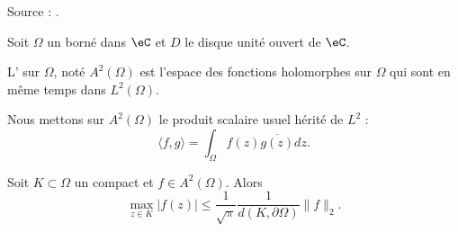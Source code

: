 Source : \cite{ytMOpe}.

Soit \( \Omega\) un borné dans \( \eC\) et \( D\) le disque unité ouvert de \( \eC\).

\begin{definition}
    L' sur \( \Omega\), noté \( A^2(\Omega)\) est l'espace des fonctions holomorphes sur \( \Omega\) qui sont en même temps dans \( L^2(\Omega)\).
\end{definition}
Nous mettons sur \( A^2(\Omega)\) le produit scalaire usuel hérité de \( L^2\) :
\begin{equation}
    \langle f, g\rangle =\int_{\Omega}f(z)\overline{ g(z) }dz.
\end{equation}

\begin{lemma}   \label{LemIZxKfB}
    Soit \( K\subset \Omega\) un compact et \( f\in A^2(\Omega)\). Alors
    \begin{equation}
        \max_{z\in K}| f(z) |\leq \frac{1}{ \sqrt{\pi} }\frac{1}{ d(K,\partial \Omega) }\| f \|_2.
    \end{equation}
\end{lemma}

